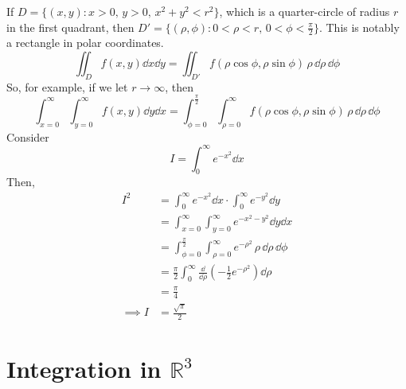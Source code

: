 \documentclass{article}
\begin{document}
If $D = \{ (x, y) \colon x > 0,\, y > 0,\, x^2 + y^2 < r^2 \}$, which is a quarter-circle of radius $r$ in the first quadrant, then $D' = \{ (\rho, \phi) \colon 0 < \rho < r,\, 0 < \phi < \frac{\pi}{2} \}$. This is notably a rectangle in polar coordinates.
\[ \iint_D f(x, y)\dd{x} \dd{y} = \iint_{D'} f(\rho \cos \phi, \rho \sin \phi) \,\rho \,\dd \rho \,\dd \phi \]
So, for example, if we let $r \to \infty$, then
\[ \int_{x=0}^\infty \int_{y=0}^\infty f(x, y) \dd{y}\dd{x} = \int_{\phi = 0}^{\frac{\pi}{2}} \int_{\rho = 0}^\infty f(\rho \cos \phi, \rho \sin \phi) \,\rho\,\dd \rho\,\dd \phi \]
Consider
\[ I = \int_0^\infty e^{-x^2} \dd{x} \]
Then,
\begin{align*}
	I^2        & = \int_0^\infty e^{-x^2} \dd{x} \cdot \int_0^\infty e^{-y^2} \dd{y}                                \\
	           & = \int_{x=0}^\infty \int_{y=0}^\infty e^{-x^2-y^2} \dd{y}\dd{x}                                    \\
	           & = \int_{\phi = 0}^{\frac{\pi}{2}} \int_{\rho = 0}^\infty e^{-\rho^2} \,\rho\,\dd \rho\,\dd \phi    \\
	           & = \frac{\pi}{2} \int_0^\infty \frac{\dd}{\dd \rho} \left( -\frac{1}{2}e^{-\rho^2} \right) \dd \rho \\
	           & = \frac{\pi}{4}                                                                                    \\
	\implies I & = \frac{\sqrt{\pi}}{2}
\end{align*}

\section{Integration in $\mathbb R^3$}
\end{document}
